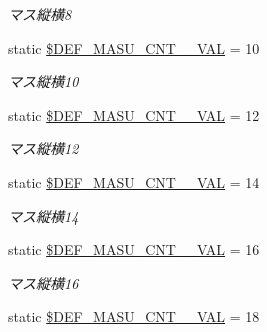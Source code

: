 \begin{DoxyCompactItemize}
\begin{DoxyCompactList}\small\item\em マス縦横8 \end{DoxyCompactList}\item 
static \hyperlink{class_reversi_const_a711060d4402e0e7f4e5ea5f9c3d0e407}{\$\+D\+E\+F\+\_\+\+M\+A\+S\+U\+\_\+\+C\+N\+T\+\_\+\_\+\+V\+AL} = 10\hypertarget{class_reversi_const_a711060d4402e0e7f4e5ea5f9c3d0e407}{}\label{class_reversi_const_a711060d4402e0e7f4e5ea5f9c3d0e407}

\begin{DoxyCompactList}\small\item\em マス縦横10 \end{DoxyCompactList}\item 
static \hyperlink{class_reversi_const_a78b9d9b338b9f7293eb44fbc88b44a7e}{\$\+D\+E\+F\+\_\+\+M\+A\+S\+U\+\_\+\+C\+N\+T\+\_\+\_\+\+V\+AL} = 12\hypertarget{class_reversi_const_a78b9d9b338b9f7293eb44fbc88b44a7e}{}\label{class_reversi_const_a78b9d9b338b9f7293eb44fbc88b44a7e}

\begin{DoxyCompactList}\small\item\em マス縦横12 \end{DoxyCompactList}\item 
static \hyperlink{class_reversi_const_a0fa489876583e3c7afae744b9c4e2fd1}{\$\+D\+E\+F\+\_\+\+M\+A\+S\+U\+\_\+\+C\+N\+T\+\_\+\_\+\+V\+AL} = 14\hypertarget{class_reversi_const_a0fa489876583e3c7afae744b9c4e2fd1}{}\label{class_reversi_const_a0fa489876583e3c7afae744b9c4e2fd1}

\begin{DoxyCompactList}\small\item\em マス縦横14 \end{DoxyCompactList}\item 
static \hyperlink{class_reversi_const_ab29f123aba64c8d34c895ef700ad9c6b}{\$\+D\+E\+F\+\_\+\+M\+A\+S\+U\+\_\+\+C\+N\+T\+\_\+\_\+\+V\+AL} = 16\hypertarget{class_reversi_const_ab29f123aba64c8d34c895ef700ad9c6b}{}\label{class_reversi_const_ab29f123aba64c8d34c895ef700ad9c6b}

\begin{DoxyCompactList}\small\item\em マス縦横16 \end{DoxyCompactList}\item 
static \hyperlink{class_reversi_const_a4232cfd29ffc57b86911fef7b04ba056}{\$\+D\+E\+F\+\_\+\+M\+A\+S\+U\+\_\+\+C\+N\+T\+\_\+\_\+\+V\+AL} = 18\hypertarget{class_reversi_const_a4232cfd29ffc57b86911fef7b04ba056}{}\label{class_reversi_const_a4232cfd29ffc57b86911fef7b04ba056}


\end{DoxyCompactItemize}
